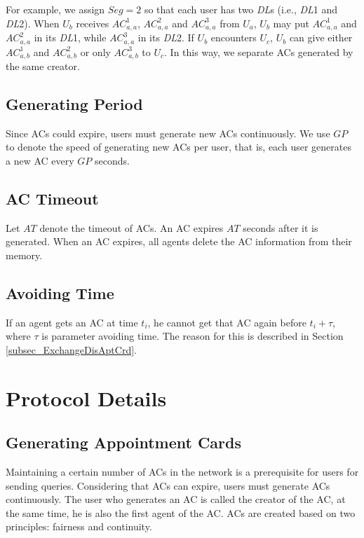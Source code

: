 For example, we assign $Seg=2$ so that each user has two \textit{DL}s (i.e., \textit{DL}1 and \textit{DL}2). When $U_b$ receives ${AC}^1_{a,a}$, ${AC}^2_{a,a}$ and ${AC}^3_{a,a}$ from $U_a$, $U_b$ may put ${AC}^1_{a,a}$ and ${AC}^2_{a,a}$ in its \textit{DL}1, while ${AC}^3_{a,a}$ in its \textit{DL}2. If $U_b$ encounters $U_c$, $U_b$ can give either ${AC}^1_{a,b}$ and ${AC}^2_{a,b}$ or only ${AC}^3_{a,b}$ to $U_c$. In this way, we separate ACs generated by the same creator.


\subsection{ Generating Period}

\noindent Since ACs could expire, users must generate new ACs continuously. We use $GP$ to denote the speed of generating new ACs per user, that is, each user generates a new AC every $GP$ seconds.


\subsection{ AC Timeout}

\noindent Let $AT$ denote the timeout of ACs. An AC expires $AT$ seconds after it is generated. When an AC expires, all agents delete the AC information from their memory.


\subsection{ Avoiding Time}

\noindent If an agent gets an AC at time $t_i$, he cannot get that AC again before $t_i+\tau $, where $\tau$ is parameter avoiding time. The reason for this is described in Section \ref{subsec_ExchangeDisAptCrd}.


\section{ Protocol Details}


\subsection{ Generating Appointment Cards}

\noindent Maintaining a certain number of ACs in the network is a prerequisite for users for sending queries. Considering that ACs can expire, users must generate ACs continuously. The user who generates an AC is called the creator of the AC, at the same time, he is also the first agent of the AC. ACs are created based on two principles: fairness and continuity. 

